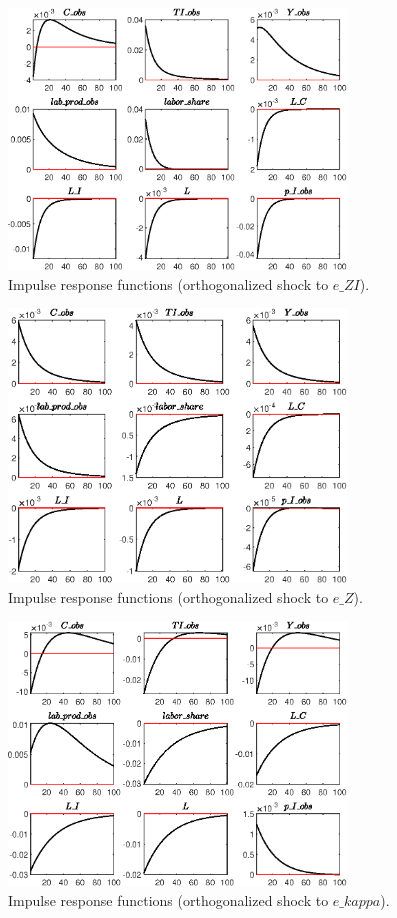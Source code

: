  
\begin{figure}[H]
\centering 
\includegraphics[width=0.80\textwidth]{directed_search_est/graphs/directed_search_est_IRF_e_ZI}
\caption{Impulse response functions (orthogonalized shock to $e\_ZI$).}
\label{Fig:IRF:e_ZI}
\end{figure}
 
\begin{figure}[H]
\centering 
\includegraphics[width=0.80\textwidth]{directed_search_est/graphs/directed_search_est_IRF_e_Z}
\caption{Impulse response functions (orthogonalized shock to $e\_Z$).}
\label{Fig:IRF:e_Z}
\end{figure}
 
\begin{figure}[H]
\centering 
\includegraphics[width=0.80\textwidth]{directed_search_est/graphs/directed_search_est_IRF_e_kappa}
\caption{Impulse response functions (orthogonalized shock to $e\_kappa$).}
\label{Fig:IRF:e_kappa}
\end{figure}
 
 

